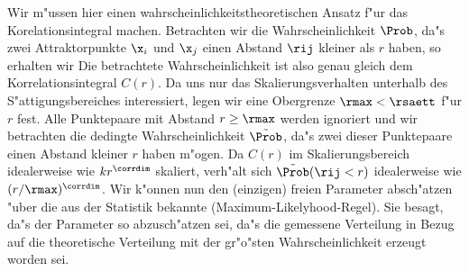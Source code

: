 Wir m"ussen hier einen wahrscheinlichkeitstheoretischen Ansatz f"ur das
Korelationsintegral machen. Betrachten wir die Wahrscheinlichkeit $\Prob$, da"s zwei
Attraktorpunkte $\x_i$ und $\x_j$ einen Abstand $\rij$ kleiner als $r$ haben, so erhalten wir
Die betrachtete Wahrscheinlichkeit ist also genau gleich dem Korrelationsintegral $C(r)$.
Da uns nur das Skalierungsverhalten unterhalb des S"attigungsbereiches interessiert,
legen wir eine Obergrenze $\rmax<\rsaett$ f"ur $r$ fest. Alle Punktepaare mit Abstand
$r\geq\rmax$ werden ignoriert und wir betrachten die dedingte Wahrscheinlichkeit $\tilde
\Prob$, da"s zwei dieser Punktepaare einen Abstand kleiner $r$ haben m"ogen.
Da $C(r)$ im Skalierungsbereich idealerweise wie $kr^\corrdim$ skaliert, verh"alt sich
$\tilde \Prob(\rij<r)$ idealerweise wie $(r/\rmax)^\corrdim$.
Wir k"onnen nun den (einzigen) freien Parameter absch"atzen "uber die aus der Statistik
bekannte \begriff(Maximum-Likelyhood-Regel). Sie besagt, da"s der Parameter so
abzusch"atzen sei, da"s die gemessene Verteilung in Bezug auf die theoretische Verteilung
mit der gr"o"sten Wahrscheinlichkeit erzeugt worden sei.

